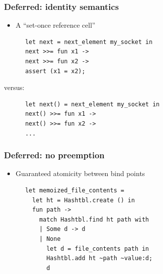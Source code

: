 \documentclass{beamer}
\begin{document}

\begin{frame}[fragile]
\frametitle{Deferred: identity semantics}
\begin{itemize}
\item A ``set-once reference cell''
\end{itemize}
{\footnotesize
\begin{verbatim}
      let next = next_element my_socket in
      next >>= fun x1 ->
      next >>= fun x2 ->
      assert (x1 = x2);
\end{verbatim}}
\hspace{1cm}versus:
{\footnotesize
\begin{verbatim}
      let next() = next_element my_socket in
      next() >>= fun x1 ->
      next() >>= fun x2 ->
      ...
\end{verbatim}}
\end{frame}






\begin{frame}[fragile]
\frametitle{Deferred: no preemption}
\begin{itemize}
\item Guaranteed atomicity between bind points
\end{itemize}
{\footnotesize
\begin{verbatim}
      let memoized_file_contents =
        let ht = Hashtbl.create () in
        fun path ->
          match Hashtbl.find ht path with
          | Some d -> d
          | None
            let d = file_contents path in
            Hashtbl.add ht ~path ~value:d;
            d
\end{verbatim}}
\end{frame}
\end{document}
